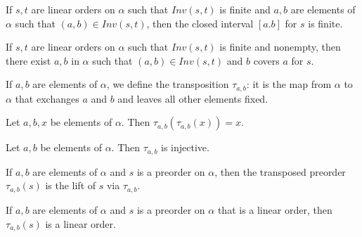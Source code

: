 \begin{sublemma}
If $s,t$ are linear orders on $\alpha$ such that $Inv(s,t)$ is finite and $a,b$ are elements of $\alpha$ such that
$(a,b)\in Inv(s,t)$, then the closed interval $[a.b]$ for $s$ is finite.

\end{sublemma}

\begin{sublemma}
If $s,t$ are linear orders on $\alpha$ such that $Inv(s,t)$ is finite and nonempty, then there exist $a,b$ in $\alpha$ such that
$(a,b)\in Inv(s,t)$ and $b$ covers $a$ for $s$.

\end{sublemma}

\begin{subdefi}[Transposition]
If $a,b$ are elements of $\alpha$, we define the transposition $\tau_{a,b}$: it is the map from $\alpha$ to $\alpha$ that exchanges
$a$ and $b$ and leaves all other elements fixed.

\end{subdefi}

\begin{sublemma}
Let $a,b,x$ be elements of $\alpha$. Then $\tau_{a,b}(\tau_{a,b}(x))=x$.

\end{sublemma}

\begin{sublemma}
Let $a,b$ be elements of $\alpha$. Then $\tau_{a,b}$ is injective.

\end{sublemma}

\begin{subdefi}[TransposedPreorder]
If $a,b$ are elements of $\alpha$ and $s$ is a preorder on $\alpha$, then the transposed preorder $\tau_{a,b}(s)$ is the lift of
$s$ via $\tau_{a,b}$.

\end{subdefi}

\begin{subdefi}
If $a,b$ are elements of $\alpha$ and $s$ is a preorder on $\alpha$ that is a linear order, then $\tau_{a,b}(s)$ is a linear order.

\end{subdefi}


